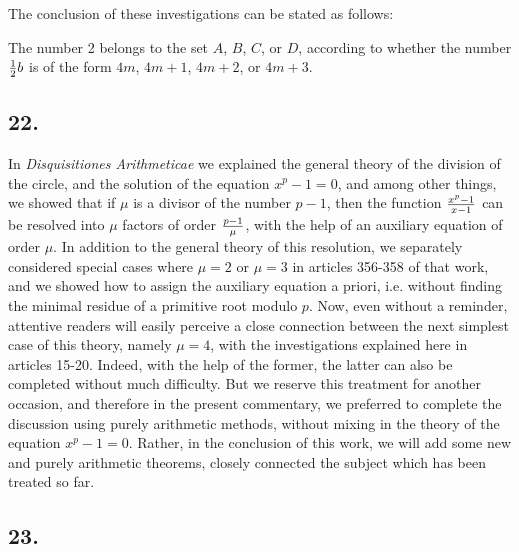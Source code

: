 \documentclass[twoside,12pt]{memoir}
\let\oldfrac\frac
\def\frac#1#2{\mathchoice{\tfrac{#1}{#2}}{\oldfrac{#1}{#2}}{\genfrac{}{}{}{2}{#1}{#2\mathstrut}}{\genfrac{}{}{}{3}{#1}{#2\mathstrut}}}
\begin{document}
The conclusion of these investigations can be stated as follows:

The number 2 belongs to the set \(A\), \(B\), \(C\), or \(D\), according to whether the number \(\frac{1}{2} b\) is of the form \(4m\), \(4m+1\), \(4m+2\), or \(4m+3\).

\subsection*{22.}

In \textit{Disquisitiones Arithmeticae} we explained the general theory of the division of the circle, and the solution of the equation \(x^{p}-1=0\), and among other things, we showed that if \(\mu\) is a divisor of the number \(p-1\), then the function \(\frac{x^{p}-1}{x-1}\) can be resolved into \(\mu\) factors of order \(\frac{p-1}{\mu}\), with the help of an auxiliary equation of order \(\mu\). In addition to the general theory of this resolution, we separately considered special cases where \(\mu=2\) or \(\mu=3\) in articles 356-358 of that work, and we showed how to assign the auxiliary equation a priori, i{.}e{.} without finding the minimal residue of a primitive root modulo \(p\). Now, even without a reminder, attentive readers will easily perceive a close connection between the next simplest case of this theory, namely \(\mu=4\), with the investigations explained here in articles 15-20.  Indeed, with the help of the former, the latter can also be completed without much difficulty. But we reserve this treatment for another occasion, and therefore in the present commentary, we preferred to complete the discussion using purely arithmetic methods, without mixing in the theory of the equation \(x^{p}-1=0\). Rather, in the conclusion of this work, we will add some new and purely arithmetic theorems, closely connected the subject which has been treated so far.

\subsection*{23.}
 
\end{document}
